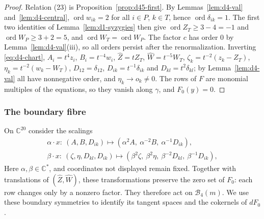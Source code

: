 \documentclass[Threeside,11pt]{article}
\theoremstyle{definition}
\theoremstyle{remark}
\numberwithin{equation}{section}
\newcommand{\C}{\mathbb C}\newcommand{\T}{\mathbb T}
\theoremstyle{remark}
\newcommand{\ord}{\operatorname{ord}}
\begin{document}
\begin{proof}
Relation (23) is Proposition~\ref{prop:d45-first}.  By Lemmas~\ref{lem:d4-val}
and~\ref{lem:d4-central}, $\ord w_{ik}=2$ for all $i\in P$, $k\in T$, hence $\ord\delta_{ik}=1$.
The first two identities of Lemma~\ref{lem:d1-syzygies} then give $\ord Z_T\ge3-4=-1$ and
$\ord W_P\ge3+2=5$, and $\ord W_T=\ord W_P$.  The factor $c$ has order $0$ by
Lemma~\ref{lem:d4-val}(iii), so all orders persist after the renormalization.  Inverting
\eqref{eq:d4-chart}, $A_i=t^4z_i$, $B_i=t^{-4}w_i$, $\hat Z=tZ_T$, $\hat W=t^{-5}W_T$,
$\zeta_k=t^{-2}(z_k-Z_T)$, $\eta_k=t^{-2}(w_k-W_T)$, $D_{12}=\delta_{12}$, $D_{ik}=t^{-1}\delta_{ik}$
and $D_{kl}=t^2\delta_{kl}$; by Lemma~\ref{lem:d4-val} all have nonnegative order, and
$\eta_k\to o_k\ne0$.  The rows of $F$ are monomial multiples of the equations, so they vanish
along $\gamma$, and $F_0(y)=0$.
\end{proof}

\subsubsection{The boundary fibre}\label{d4-fibre}
On $\C^{20}$ consider the scalings
\[
\begin{gathered}
  \alpha\cdot x:\ (A,B,D_{ik})\mapsto(\alpha^2A,\ \alpha^{-2}B,\ \alpha^{-1}D_{ik}),\\
  \beta\cdot x:\ (\zeta,\eta,D_{kl},D_{ik})\mapsto(\beta^2\zeta,\ \beta^2\eta,\ \beta^{-2}D_{kl},\
  \beta^{-1}D_{ik}),
\end{gathered}
\]
{Here $\alpha,\beta\in\C^*$, and coordinates not displayed remain fixed.
Together with translations of $(\hat Z,\hat W)$, these transformations preserve the zero set
of $F_0$: each row changes only by a nonzero factor.
They therefore act on $\mathcal B_4(m)$. We use these boundary symmetries to
identify its tangent spaces and the cokernels of $dF_0$.}
\end{document}
